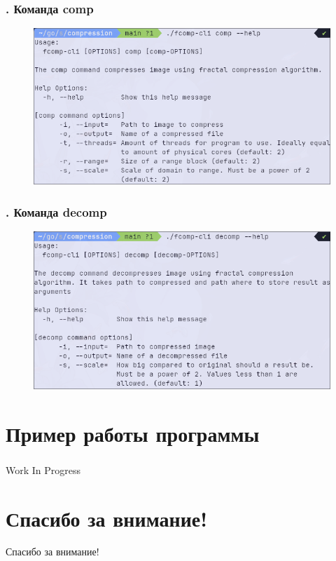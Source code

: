 \documentclass[t aspectratio=169]{beamer}
\begin{document}
  \begin{frame}\frametitle{\insertsection. Команда comp}
   \begin{figure}
    \begin{center}
      \includegraphics[width=\textwidth]{./images/cli-comp.png}
    \end{center}
   \end{figure}
  \end{frame}

  \begin{frame}\frametitle{\insertsection. Команда decomp}
   \begin{figure}
    \begin{center}
      \includegraphics[width=\textwidth]{./images/cli-decomp.png}
    \end{center}
   \end{figure}
  \end{frame}

  \section{Пример работы программы}
  \begin{frame}\frametitle{\insertsection}
    Work In Progress
  \end{frame}

  \section*{Спасибо за внимание!}
  \begin{frame}
    \begin{center}
      \huge Спасибо за внимание!\normalfont
    \end{center}
  \end{frame}
\end{document}
